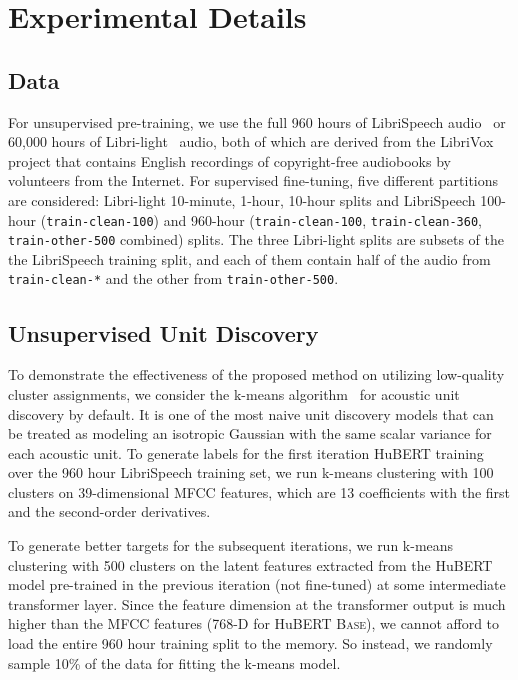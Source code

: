\section{Experimental Details}

\subsection{Data}\label{sec:data}
For unsupervised pre-training, we use the full 960 hours of LibriSpeech audio~\cite{panayotov2015librispeech} or 60,000 hours of Libri-light~\cite{kahn2020libri} audio, both of which are derived from the LibriVox project that contains English recordings of copyright-free audiobooks by volunteers from the Internet.
For supervised fine-tuning, five different partitions are considered: Libri-light 10-minute, 1-hour, 10-hour splits and LibriSpeech 100-hour (\texttt{train-clean-100}) and 960-hour (\texttt{train-clean-100}, \texttt{train-clean-360}, \texttt{train-other-500} combined) splits. The three Libri-light splits are subsets of the the LibriSpeech training split, and each of them contain half of the audio from \texttt{train-clean-*} and the other from \texttt{train-other-500}.


\subsection{Unsupervised Unit Discovery}
To demonstrate the effectiveness of the proposed method on utilizing low-quality cluster assignments, we consider the k-means algorithm~\cite{lloyd1982least} for acoustic unit discovery by default. It is one of the most naive unit discovery models that can be treated as modeling an isotropic Gaussian with the same scalar variance for each acoustic unit.
To generate labels for the first iteration HuBERT training over the 960 hour LibriSpeech training set, we run k-means clustering with 100 clusters on 39-dimensional MFCC features, which are 13 coefficients with the first and the second-order derivatives.

To generate better targets for the subsequent iterations, we run k-means clustering with 500 clusters on the latent features extracted from the HuBERT model pre-trained in the previous iteration (not fine-tuned) at some intermediate transformer layer.
Since the feature dimension at the transformer output is much higher than the MFCC features (768-D for HuBERT \textsc{Base}), we cannot afford to load the entire 960 hour training split to the memory. So instead, we randomly sample 10\% of the data for fitting the k-means model.

